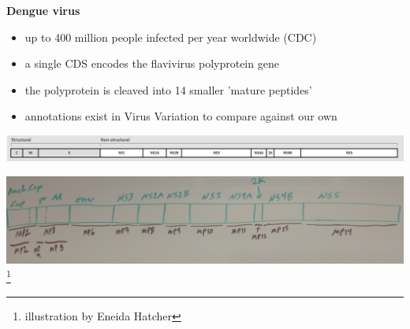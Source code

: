 \documentclass[landscape]{slides}
\begin{document}
\begin{slide}
\begin{center}
\textbf{Dengue virus}

\small
\begin{itemize}
\item up to 400 million people infected per year worldwide (CDC)
\item a single CDS encodes the flavivirus polyprotein gene
\item the polyprotein is cleaved into 14 smaller 'mature peptides'
\item annotations exist in Virus Variation to compare against our own
\end{itemize}

\includegraphics[width=9.5in]{figs/dengue-genome-organization}

\includegraphics[width=9.5in]{figs/dengue-eneida}\footnote{illustration
  by Eneida Hatcher}


\end{center}
\vfill
\end{slide}
\end{document}
